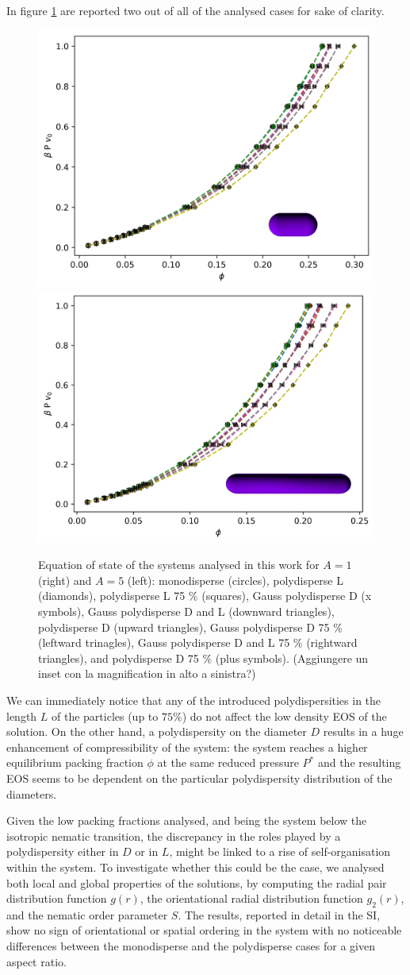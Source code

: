 \documentclass[journal=jacsat,manuscript=article]{achemso}
\begin{document}
In figure \ref{fig:EOS_HSC_comparison} are reported two out of all of the analysed cases for sake of clarity.

\begin{figure}[!h]
    \centering
    \includegraphics[width=0.45 \columnwidth]{Figures/EOS_A1.png}
    \includegraphics[width=0.45 \columnwidth]{Figures/EOS_A5.png}
    \caption{Equation of state of the systems analysed in this work for $A = 1$ (right) and $A = 5$ (left): monodisperse (circles), polydisperse L (diamonds), polydisperse L 75 \% (squares), Gauss polydisperse D (x symbols), Gauss polydisperse D and L (downward triangles), polydisperse D (upward triangles), Gauss polydisperse D 75 \% (leftward trinagles), Gauss polydisperse D and L 75 \% (rightward triangles), and polydisperse D 75 \% (plus symbols).  (Aggiungere un inset con la magnification in alto a sinistra?)}
    \label{fig:EOS_HSC_comparison}
\end{figure}

We can immediately notice that any of the introduced polydispersities in the length $L$ of the particles (up to $75\%$) do not affect the low density EOS of the solution. On the other hand, a polydispersity on the diameter $D$ results in a huge enhancement of compressibility of the system: the system reaches a higher equilibrium packing fraction $\phi$ at the same reduced pressure $P^*$ and the resulting EOS seems to be dependent on the particular polydispersity distribution of the diameters.

Given the low packing fractions analysed, and being the system below the isotropic nematic transition, the discrepancy in the roles played by a polydispersity either in $D$ or in $L$, might be linked to a rise of  self-organisation within the system. To investigate whether this could be the case, we analysed both local and global properties of the solutions, by computing the  radial pair distribution function $g(r)$, the orientational radial distribution function $g_2(r)$, and the nematic order parameter $S$.  The results, reported in detail in the SI, show no sign of orientational or spatial ordering in the system with no noticeable differences between the monodisperse and the polydisperse cases for a given aspect ratio.
\end{document}
